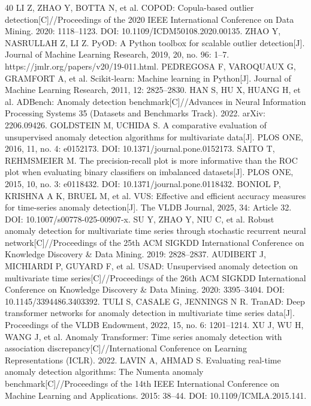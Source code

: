 \documentclass[twocolumn,11pt]{ctexart}
\begin{document}
\begin{thebibliography}{40}
 LI Z, ZHAO Y, BOTTA N, et al. COPOD: Copula-based outlier detection[C]//Proceedings of the 2020 IEEE International Conference on Data Mining. 2020: 1118–1123. DOI: 10.1109/ICDM50108.2020.00135.
 ZHAO Y, NASRULLAH Z, LI Z. PyOD: A Python toolbox for scalable outlier detection[J]. Journal of Machine Learning Research, 2019, 20, no. 96: 1–7. https://jmlr.org/papers/v20/19-011.html.
 PEDREGOSA F, VAROQUAUX G, GRAMFORT A, et al. Scikit-learn: Machine learning in Python[J]. Journal of Machine Learning Research, 2011, 12: 2825–2830.
 HAN S, HU X, HUANG H, et al. ADBench: Anomaly detection benchmark[C]//Advances in Neural Information Processing Systems 35 (Datasets and Benchmarks Track). 2022. arXiv: 2206.09426.
 GOLDSTEIN M, UCHIDA S. A comparative evaluation of unsupervised anomaly detection algorithms for multivariate data[J]. PLOS ONE, 2016, 11, no. 4: e0152173. DOI: 10.1371/journal.pone.0152173.
 SAITO T, REHMSMEIER M. The precision-recall plot is more informative than the ROC plot when evaluating binary classifiers on imbalanced datasets[J]. PLOS ONE, 2015, 10, no. 3: e0118432. DOI: 10.1371/journal.pone.0118432.
 BONIOL P, KRISHNA A K, BRUEL M, et al. VUS: Effective and efficient accuracy measures for time-series anomaly detection[J]. The VLDB Journal, 2025, 34: Article 32. DOI: 10.1007/s00778-025-00907-x.
 SU Y, ZHAO Y, NIU C, et al. Robust anomaly detection for multivariate time series through stochastic recurrent neural network[C]//Proceedings of the 25th ACM SIGKDD International Conference on Knowledge Discovery \& Data Mining. 2019: 2828–2837.
 AUDIBERT J, MICHIARDI P, GUYARD F, et al. USAD: Unsupervised anomaly detection on multivariate time series[C]//Proceedings of the 26th ACM SIGKDD International Conference on Knowledge Discovery \& Data Mining. 2020: 3395–3404. DOI: 10.1145/3394486.3403392.
 TULI S, CASALE G, JENNINGS N R. TranAD: Deep transformer networks for anomaly detection in multivariate time series data[J]. Proceedings of the VLDB Endowment, 2022, 15, no. 6: 1201–1214.
 XU J, WU H, WANG J, et al. Anomaly Transformer: Time series anomaly detection with association discrepancy[C]//International Conference on Learning Representations (ICLR). 2022.
 LAVIN A, AHMAD S. Evaluating real-time anomaly detection algorithms: The Numenta anomaly benchmark[C]//Proceedings of the 14th IEEE International Conference on Machine Learning and Applications. 2015: 38–44. DOI: 10.1109/ICMLA.2015.141.

\end{thebibliography}
\end{document}
